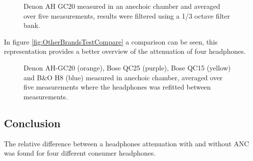 \begin{figure}[H]
	\centering
	
	\caption{Denon AH GC20 measured in an anechoic chamber and averaged over five measurements, results were filtered using a 1/3 octave filter bank.}
	\label{fig:DenonComp}
\end{figure}

In figure \autoref{fig:OtherBrandsTestCompare} a comparison can be seen, this representation provides a better overview of the attenuation of four headphones.


\begin{figure}[H]
	\centering
	
	\caption{Denon AH-GC20 (orange), Bose QC25 (purple), Bose QC15 (yellow) and B\&O H8 (blue) measured in anechoic chamber, averaged over five measurements where the headphones was refitted between measurements.}
	\label{fig:OtherBrandsTestCompare}
\end{figure}




\subsection{Conclusion}
The relative difference between a headphones attenuation with and without ANC was found for four different consumer headphones.



